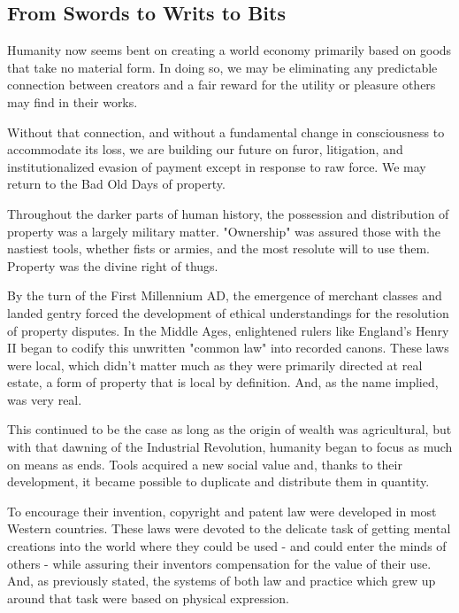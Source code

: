 \documentclass[
]{article}
\begin{document}
\hypertarget{header-n223}{%
\subsection{From Swords to Writs to Bits}\label{header-n223}}

Humanity now seems bent on creating a world economy primarily based on
goods that take no material form. In doing so, we may be eliminating any
predictable connection between creators and a fair reward for the
utility or pleasure others may find in their works.

Without that connection, and without a fundamental change in
consciousness to accommodate its loss, we are building our future on
furor, litigation, and institutionalized evasion of payment except in
response to raw force. We may return to the Bad Old Days of property.

Throughout the darker parts of human history, the possession and
distribution of property was a largely military matter. "Ownership" was
assured those with the nastiest tools, whether fists or armies, and the
most resolute will to use them. Property was the divine right of thugs.

By the turn of the First Millennium AD, the emergence of merchant
classes and landed gentry forced the development of ethical
understandings for the resolution of property disputes. In the Middle
Ages, enlightened rulers like England's Henry II began to codify this
unwritten "common law" into recorded canons. These laws were local,
which didn't matter much as they were primarily directed at real estate,
a form of property that is local by definition. And, as the name
implied, was very real.

This continued to be the case as long as the origin of wealth was
agricultural, but with that dawning of the Industrial Revolution,
humanity began to focus as much on means as ends. Tools acquired a new
social value and, thanks to their development, it became possible to
duplicate and distribute them in quantity.

To encourage their invention, copyright and patent law were developed in
most Western countries. These laws were devoted to the delicate task of
getting mental creations into the world where they could be used - and
could enter the minds of others - while assuring their inventors
compensation for the value of their use. And, as previously stated, the
systems of both law and practice which grew up around that task were
based on physical expression.
\end{document}
